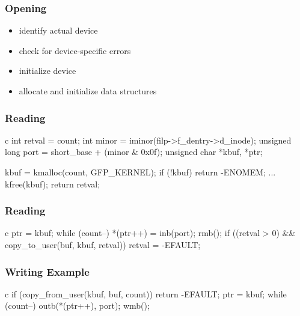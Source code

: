 \documentclass[dvipsnames]{beamer}
\begin{document}
\begin{frame}
  \frametitle{Opening}

  \begin{itemize}
    \item identify actual device
    \item check for device-specific errors
    \item initialize device
    \item allocate and initialize data structures
  \end{itemize}
\end{frame}

\begin{frame}[fragile]
  \frametitle{Reading}

  \begin{example}
    \begin{pygments}{c}
int retval = count;
int minor = iminor(filp->f_dentry->d_inode);
unsigned long port = short_base +
                      (minor & 0x0f);
unsigned char *kbuf, *ptr;

kbuf = kmalloc(count, GFP_KERNEL);
if (!kbuf)
    return -ENOMEM;
...
kfree(kbuf);
return retval;
    \end{pygments}
  \end{example}
\end{frame}

\begin{frame}[fragile]
  \frametitle{Reading}

  \begin{example}
    \begin{pygments}{c}
ptr = kbuf;
while (count--) {
    *(ptr++) = inb(port);
    rmb();
}
if ((retval > 0) &&
        copy_to_user(buf, kbuf, retval))
    retval = -EFAULT;
    \end{pygments}
  \end{example}
\end{frame}

\begin{frame}[fragile]
  \frametitle{Writing Example}

  \begin{example}
    \begin{pygments}{c}
if (copy_from_user(kbuf, buf, count))
    return -EFAULT;
ptr = kbuf;
while (count--) {
    outb(*(ptr++), port);
    wmb();
}
    \end{pygments}
  \end{example}
\end{frame}
\end{document}
